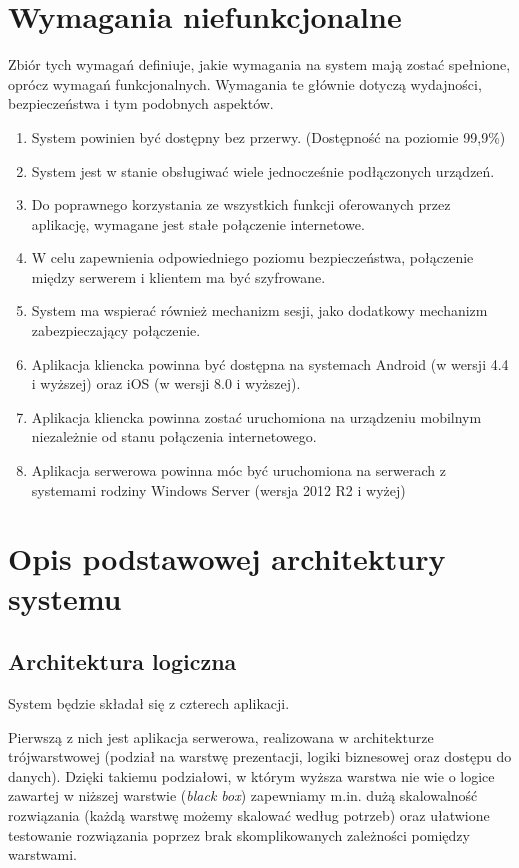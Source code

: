 \section{Wymagania niefunkcjonalne}
Zbiór tych wymagań definiuje, jakie wymagania na system mają zostać spełnione, oprócz wymagań funkcjonalnych. Wymagania te głównie dotyczą wydajności, bezpieczeństwa i tym podobnych aspektów.
\begin{enumerate}
\item System powinien być dostępny bez przerwy. (Dostępność na poziomie 99,9\%)
\item System jest w stanie obsługiwać wiele jednocześnie podłączonych urządzeń.
\item Do poprawnego korzystania ze wszystkich funkcji oferowanych przez aplikację, wymagane jest stałe połączenie internetowe.
\item W celu zapewnienia odpowiedniego poziomu bezpieczeństwa, połączenie między serwerem i klientem ma być szyfrowane.
\item System ma wspierać również mechanizm sesji, jako dodatkowy mechanizm zabezpieczający połączenie.
\item Aplikacja kliencka powinna być dostępna na systemach Android (w wersji 4.4 i wyższej) oraz iOS (w wersji 8.0 i wyższej).
\item Aplikacja kliencka powinna zostać uruchomiona na urządzeniu mobilnym niezależnie od stanu połączenia internetowego.
\item Aplikacja serwerowa powinna móc być uruchomiona na serwerach z systemami rodziny Windows Server (wersja 2012 R2 i wyżej)

\end{enumerate}
\newpage
\section{Opis podstawowej architektury systemu}
\subsection*{Architektura logiczna}
System będzie składał się z czterech aplikacji. 

\par Pierwszą z nich jest aplikacja serwerowa, realizowana w architekturze trójwarstwowej (podział na warstwę prezentacji, logiki biznesowej oraz dostępu do danych). Dzięki takiemu podziałowi, w którym wyższa warstwa nie wie o logice zawartej w niższej warstwie (\textit{black box}) zapewniamy m.in. dużą skalowalność rozwiązania (każdą warstwę możemy skalować według potrzeb) oraz ułatwione testowanie rozwiązania poprzez brak skomplikowanych zależności pomiędzy warstwami.

